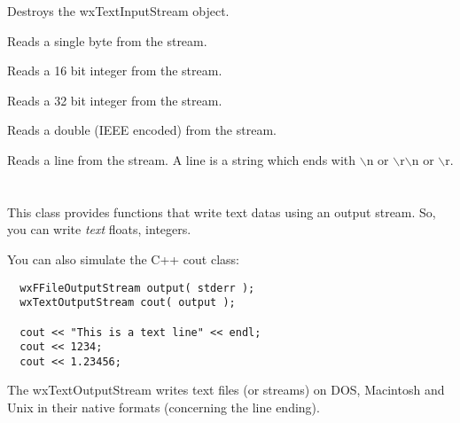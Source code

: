 Destroys the wxTextInputStream object.



Reads a single byte from the stream.



Reads a 16 bit integer from the stream.



Reads a 32 bit integer from the stream.



Reads a double (IEEE encoded) from the stream.



Reads a line from the stream. A line is a string which ends with
$\backslash$n or $\backslash$r$\backslash$n or $\backslash$r.


\section{}\label{wxtextoutputstream}

This class provides functions that write text datas using an output stream.
So, you can write {\it text} floats, integers.

You can also simulate the C++ cout class:
\begin{verbatim}
  wxFFileOutputStream output( stderr );
  wxTextOutputStream cout( output );

  cout << "This is a text line" << endl;
  cout << 1234;
  cout << 1.23456;
\end{verbatim}

The wxTextOutputStream writes text files (or streams) on DOS, Macintosh
and Unix in their native formats (concerning the line ending).


